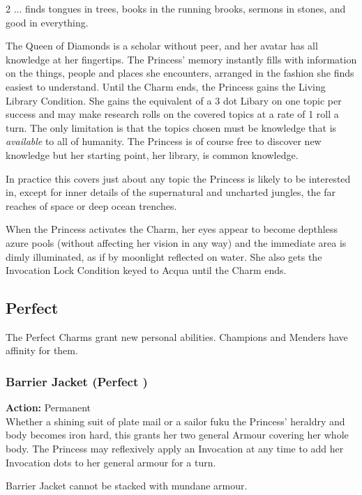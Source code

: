 \begin{multicols}{2}
\noindent ... finds tongues in trees, books in the running brooks, sermons in stones, and good in everything.

The Queen of Diamonds is a scholar without peer, and her avatar has all knowledge at her fingertips. The Princess' memory instantly fills with information on the things, people and places she encounters, arranged in the fashion she finds easiest to understand. Until the Charm ends, the Princess gains the Living Library Condition. She gains the equivalent of a 3 dot Libary on one topic per success and may make research rolls on the covered topics at a rate of 1 roll a turn. The only limitation is that the topics chosen must be knowledge that is \textit{available} to all of humanity. The Princess is of course free to discover new knowledge but her starting point, her library, is common knowledge. 

In practice this covers just about any topic the Princess is likely to be interested in, except for inner details of the supernatural and uncharted jungles, the far reaches of space or deep ocean trenches. 

When the Princess activates the Charm, her eyes appear to become depthless azure pools (without affecting her vision in any way) and the immediate area is dimly illuminated, as if by moonlight reflected on water. She also gets the Invocation Lock Condition keyed to Acqua until the Charm ends.

\subsection*{Perfect}
\label{subsec:Perfect}
The Perfect Charms grant new personal abilities. Champions and Menders have affinity for them.

\subsubsection*{Barrier Jacket (Perfect \textbullet)}

\noindent \textbf{Action:} Permanent \\

\noindent  Whether a shining suit of plate mail or a sailor fuku the Princess' heraldry and body becomes iron hard, this grants her two general Armour covering her whole body. The Princess may reflexively apply an Invocation at any time to add her Invocation dots to her general armour for a turn. 

Barrier Jacket cannot be stacked with mundane armour.


\end{multicols}
